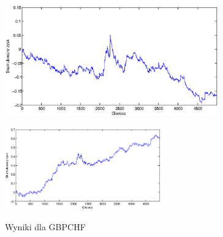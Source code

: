 \begin{figure}[h]
\begin{minipage}{.49\linewidth}
\includegraphics[width=0.82\textwidth]{images/S1d_gbpchf.eps}
\label{mansard}
\end{minipage}
\begin{minipage}{\linewidth}
\centering
\includegraphics[width=0.6\textwidth]{images/S1s_gbpchf.eps}
\label{mansard}
\end{minipage}
\caption{Wyniki dla GBPCHF}
\end{figure}
\FloatBarrier


